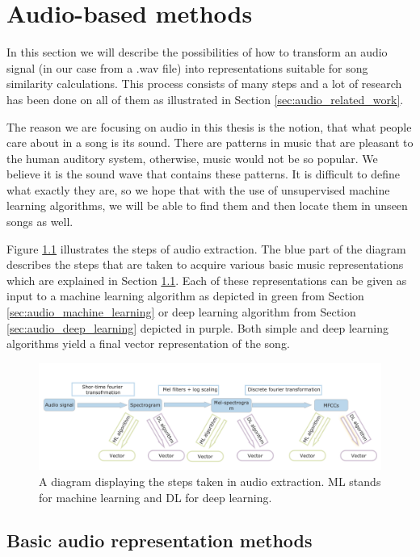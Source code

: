 \chapter{Audio-based methods}\label{chap:audio_methods}
In this section we will describe the possibilities of how to transform an audio signal (in our case from a .wav file) into representations suitable for song similarity calculations. This process consists of many steps and a lot of research has been done on all of them as illustrated in Section \ref{sec:audio_related_work}. 

The reason we are focusing on audio in this thesis is the notion, that what people care about in a song is its sound. There are patterns in music that are pleasant to the human auditory system, otherwise, music would not be so popular. We believe it is the sound wave that contains these patterns. It is difficult to define what exactly they are, so we hope that with the use of unsupervised machine learning algorithms, we will be able to find them and then locate them in unseen songs as well. 

Figure \ref{fig:audio_extraction} illustrates the steps of audio extraction. The blue part of the diagram describes the steps that are taken to acquire various basic music representations which are explained in Section \ref{sec:basic_music_representation_methods}. Each of these representations can be given as input to a machine learning algorithm as depicted in green from Section \ref{sec:audio_machine_learning} or deep learning algorithm from Section \ref{sec:audio_deep_learning} depicted in purple. Both simple and deep learning algorithms yield a final vector representation of the song. 

\begin{figure}[h!]
    \centering
	\includegraphics[width=140mm]{./img/audio_feature_extraction_steps.png}
	\caption{A diagram displaying the steps taken in audio extraction. ML stands for machine learning and DL for deep learning.}
	\label{fig:audio_extraction}
\end{figure}

\section{Basic audio representation methods}\label{sec:basic_music_representation_methods}
 

